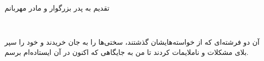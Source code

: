 \begin{acknowledgementpage}

\vspace{1.5cm}

{\large\nastaliq
{
{\par \noindent
تقدیم به پدر بزرگوار و مادر مهربانم}
\\[0.1cm]
{\par \noindent
آن دو فرشته‌ای که از خواسته‌هایشان گذشتند، سختی‌ها را به جان خریدند و خود را سپر بلای مشکلات و ناملایمات کردند تا من به جایگاهی که اکنون در آن ایستاده‌ام برسم.
}
}
}

\end{acknowledgementpage}
\newpage